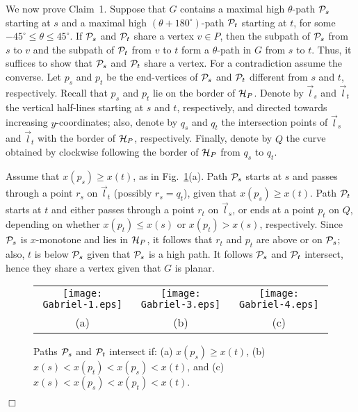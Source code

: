 \documentclass{llncs}
\renewenvironment{proof}
{{\bf Proof:}}{\hspace*{\fill}$\Box$\par\vspace{2mm}}
\begin{document}
\begin{proof}
We now prove Claim~1. Suppose that $G$ contains a maximal high $\theta$-path ${\cal P}_s$ starting at $s$ and a maximal high $(\theta+180^\circ)$-path ${\cal P}_t$ starting at $t$, for some $-45^\circ\leq \theta \leq 45^{\circ}$. If ${\cal P}_s$ and ${\cal P}_t$ share a vertex $v\in P$, then the subpath of ${\cal P}_s$ from $s$ to $v$ and the subpath of ${\cal P}_t$ from $v$ to $t$ form a $\theta$-path in $G$ from $s$ to $t$. Thus, it suffices to show that ${\cal P}_s$ and ${\cal P}_t$ share a vertex. For a contradiction assume the converse. Let $p_s$ and $p_t$ be the end-vertices of ${\cal P}_s$ and ${\cal P}_t$ different from $s$ and $t$, respectively. Recall that $p_s$ and $p_t$ lie on the border of ${\cal H}_P$. Denote by ${\vec l}_s$ and ${\vec l}_t$ the vertical half-lines starting at $s$ and $t$, respectively, and directed towards increasing $y$-coordinates; also, denote by $q_s$ and $q_t$ the intersection points of ${\vec l}_s$ and ${\vec l}_t$ with the border of ${\cal H}_P$, respectively. Finally, denote by $Q$ the curve obtained by clockwise following the border of ${\cal H}_P$ from $q_s$ to $q_t$.

Assume that $x(p_s)\geq x(t)$, as in Fig.~\ref{fig:gabriel}(a). Path ${\cal P}_s$ starts at $s$ and passes through a point $r_s$ on ${\vec l}_t$ (possibly $r_s=q_t$), given that  $x(p_s)\geq x(t)$. Path ${\cal P}_t$ starts at $t$ and either passes through a point $r_t$ on ${\vec l}_s$, or ends at a point $p_t$ on $Q$, depending on whether $x(p_t)\leq x(s)$ or $x(p_t)> x(s)$, respectively. Since ${\cal P}_s$ is $x$-monotone and lies in ${\cal H}_P$, it follows that $r_t$ and $p_t$ are above or on ${\cal P}_s$; also, $t$ is below ${\cal P}_s$ given that ${\cal P}_s$ is a high path. It follows ${\cal P}_s$ and ${\cal P}_t$ intersect, hence they share a vertex given that $G$ is planar.

\begin{figure}[tb]
\begin{center}
\begin{tabular}{c c c}
\mbox{\texttt{[image: Gabriel-1.eps]}} & \hspace{5mm}
\mbox{\texttt{[image: Gabriel-3.eps]}} & \hspace{5mm}
\mbox{\texttt{[image: Gabriel-4.eps]}}\\
(a) \hspace{5mm} & \hspace{5mm} (b) & \hspace{5mm} (c)
\end{tabular}
\caption{Paths ${\cal P}_s$ and ${\cal P}_t$ intersect if: (a) $x(p_s)\geq x(t)$, (b) $x(s)<x(p_t)<x(p_s)<x(t)$, and (c) $x(s)<x(p_s)<x(p_t)<x(t)$.}
\label{fig:gabriel}
\end{center}
\end{figure}



\end{proof}
\end{document}
